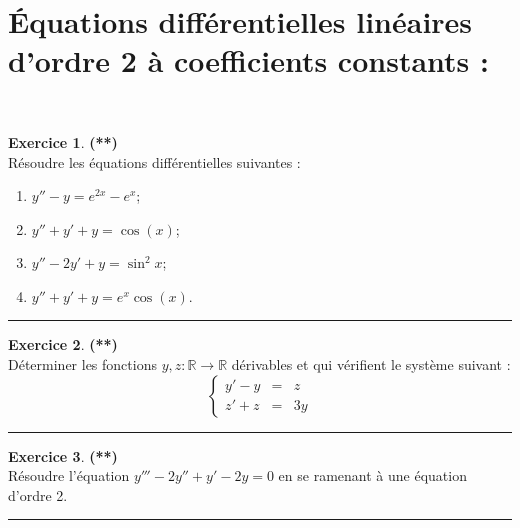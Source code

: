 \documentclass[a4paper,11pt]{article}
\theoremstyle{definition}
\newtheorem{exo}{Exercice} %
\begin{document}
\section*{Équations diﬀérentielles linéaires d’ordre 2 à coeﬃcients constants :}\hfill\\%
\begin{minipage}{1\linewidth}
	\begin{minipage}[t]{0.48\linewidth}
		\raggedright
		
		
		\begin{exo}\textbf{(**)}\quad\\[0.2cm]
	Résoudre les équations différentielles suivantes :
	\begin{enumerate}
		\item $y''-y=e^{2x}-e^x$;
		\item $y''+y'+y=\cos(x)$;
		\item $y''-2y'+y=\sin^2 x$;
		\item $y''+y'+y=e^x\cos(x)$.
	\end{enumerate}
	
	\centering
	\rule{1\linewidth}{0.6pt}
\end{exo}
		
		
		\begin{exo}\textbf{(**)}\quad\\[0.2cm]
			Déterminer les fonctions $y,z:\mathbb R\to\mathbb R$ dérivables et qui vérifient le système suivant :
			$$
			\left\{
			\begin{array}{rcl}
			y'-y&=&z\\
			z'+z&=&3y
			\end{array}
			\right.$$
			\centering
			\rule{1\linewidth}{0.6pt}
		\end{exo}
		
		\begin{exo}\textbf{(**)}\quad\\[0.2cm]
			Résoudre l'équation $y''' - 2y '' + y' - 2y = 0$ en se ramenant à une équation d'ordre 2.
			
			
			\centering
			\rule{1\linewidth}{0.6pt}
		\end{exo}
		
		
		
	\end{minipage}	
	\hfill\vrule\hfill
	\begin{minipage}[t]{0.48\linewidth}
		\raggedright
		

\end{minipage}
\end{minipage}
\end{document}
